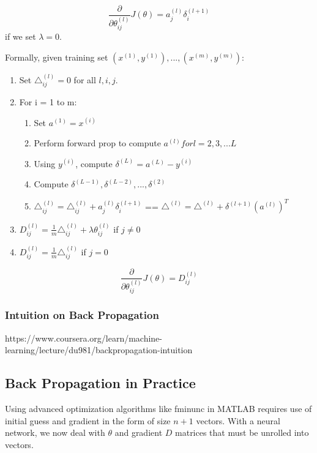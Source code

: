 \documentclass[11pt,letterpaper]{article}
\begin{document}
$$\frac{\partial}{\partial \theta_{ij}^{(l)}}J(\theta) = a_j^{(l)}\delta_i^{(l+1)} $$ if we set $\lambda = 0 $.

Formally, given training set ${(x^{(1)}, y^{(1)}),..., (x^{(m)}, y^{(m)})}$:
\begin{enumerate}
	\item  Set $\triangle_{ij}^{(l)} = 0$ for all $l, i, j$.
	\item For i = 1 to m:
	\begin{enumerate}
		\item Set $a^{(1)} = x^{(i)}$
		\item Perform forward prop to compute $a^{(l)} for l = 2,3,...L$
		\item Using $y^{(i)}$, compute $\delta^{(L)} = a^{(L)} - y^{(i)}$
		\item Compute $\delta^{(L - 1)}, \delta^{(L - 2)},..., \delta^{(2)}$
		\item $\triangle_{ij}^{(l)} = \triangle_{ij}^{(l)} + a_{j}^{(l)} \delta_{i}^{(l+1)}$ == $\triangle^{(l)} = \triangle^{(l)} + \delta^{(l+1)}(a^{(l)})^T $ 
	\end{enumerate}
	\item $ D_{ij}^{(l)} = \frac{1}{m} \triangle_{ij}^{(l)} + \lambda \theta_{ij}^{(l)}$ if $j \neq 0$
	\item $ D_{ij}^{(l)} = \frac{1}{m} \triangle_{ij}^{(l)} $ if $j = 0$
\end{enumerate}

$$ \frac{\partial}{\partial \theta_{ij}^{(l)}}J(\theta) =  D_{ij}^{(l)} $$


\subsubsection{Intuition on Back Propagation}
https://www.coursera.org/learn/machine-learning/lecture/du981/backpropagation-intuition

\subsection{Back Propagation in Practice}
Using advanced optimization algorithms like fminunc in MATLAB requires use of initial guess and gradient in the form of size $n + 1$ vectors. With a neural network, we now deal with $\theta$ and gradient $D$ matrices that must be unrolled into vectors.
\end{document}
